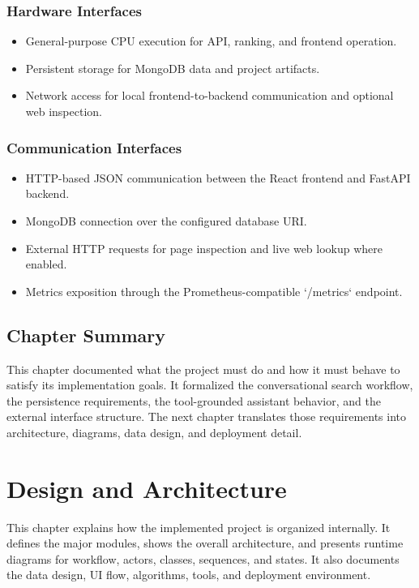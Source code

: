 \documentclass[12pt,a4paper,oneside]{report}
\begin{document}
\subsection{Hardware Interfaces}
\begin{itemize}[leftmargin=0.35in]
    \item General-purpose CPU execution for API, ranking, and frontend operation.
    \item Persistent storage for MongoDB data and project artifacts.
    \item Network access for local frontend-to-backend communication and optional web inspection.
\end{itemize}

\subsection{Communication Interfaces}
\begin{itemize}[leftmargin=0.35in]
    \item HTTP-based JSON communication between the React frontend and FastAPI backend.
    \item MongoDB connection over the configured database URI.
    \item External HTTP requests for page inspection and live web lookup where enabled.
    \item Metrics exposition through the Prometheus-compatible `/metrics` endpoint.
\end{itemize}

\section{Chapter Summary}
This chapter documented what the project must do and how it must behave to satisfy its implementation goals. It formalized the conversational search workflow, the persistence requirements, the tool-grounded assistant behavior, and the external interface structure. The next chapter translates those requirements into architecture, diagrams, data design, and deployment detail.

\chapter{Design and Architecture}

This chapter explains how the implemented project is organized internally. It defines the major modules, shows the overall architecture, and presents runtime diagrams for workflow, actors, classes, sequences, and states. It also documents the data design, UI flow, algorithms, tools, and deployment environment.
\end{document}
